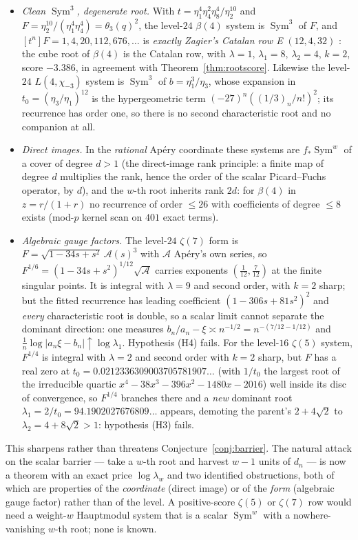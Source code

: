 \begin{itemize}
\item \emph{Clean $\operatorname{Sym}^3$, degenerate root.} With
$t=\eta_1^4\eta_4^2\eta_8^4/\eta_2^{10}$ and $F=\eta_2^{10}/(\eta_1^4\eta_4^4)=\theta_3(q)^2$,
the level-$24$ $\beta(4)$ system is $\operatorname{Sym}^3$ of $F$, and
$[t^n]F=1,4,20,112,676,\dots$ is \emph{exactly Zagier's Catalan row E} $(12,4,32)$
: the cube root of $\beta(4)$ is the Catalan row, with
$\lambda=1$, $\lambda_1=8$, $\lambda_2=4$, $k=2$, score $-3.386$, in agreement with
Theorem~\ref{thm:rootscore}. Likewise the level-$24$ $L(4,\chi_{-3})$ system is
$\operatorname{Sym}^3$ of $b=\eta_1^3/\eta_3$, whose expansion in $t_0=(\eta_3/\eta_1)^{12}$ is
the hypergeometric term $(-27)^n((1/3)_n/n!)^2$; its recurrence has order one, so there is no
second characteristic root and no companion at all.
\item \emph{Direct images.} In the \emph{rational} Apéry coordinate these systems are
$f_*\operatorname{Sym}^w$ of a cover of degree $d>1$ (the direct-image rank principle: a finite map of degree $d$ multiplies the rank, hence the order of the scalar Picard--Fuchs operator, by $d$),
and the $w$-th root inherits rank $2d$: for $\beta(4)$ in $z=r/(1+r)$ no recurrence of order
$\le26$ with coefficients of degree $\le8$ exists (mod-$p$ kernel scan on $401$ exact terms).
\item \emph{Algebraic gauge factors.} The level-$24$ $\zeta(7)$ form is
$F=\sqrt{1-34s+s^2}\,\mathcal A(s)^3$ with $\mathcal A$ Apéry's own series, so
$F^{1/6}=(1-34s+s^2)^{1/12}\sqrt{\mathcal A}$ carries exponents $(\tfrac1{12},\tfrac7{12})$ at
the finite singular points. It is integral with $\lambda=9$ and second order, with $k=2$
sharp; but the fitted recurrence has leading coefficient $(1-306s+81s^2)^2$ and \emph{every}
characteristic root is double, so a scalar limit cannot separate the dominant direction:
one measures $b_n/a_n-\xi\asymp n^{-1/2}=n^{-(7/12-1/12)}$ and
$\tfrac1n\log|a_n\xi-b_n|\uparrow\log\lambda_1$. Hypothesis (H4) fails.
For the level-$16$ $\zeta(5)$ system, $F^{1/4}$ is integral with $\lambda=2$ and second
order with $k=2$ sharp, but $F$ has a real zero at
$t_0=0.0212336309003705781907\ldots$ (with $1/t_0$ the largest root of the irreducible
quartic $x^4-38x^3-396x^2-1480x-2016$) well inside its disc of convergence, so $F^{1/4}$
branches there and a \emph{new} dominant root $\lambda_1=2/t_0=94.1902027676809\ldots$
appears, demoting the parent's $2+4\sqrt2$ to $\lambda_2=4+8\sqrt2>1$: hypothesis (H3) fails.
\end{itemize}

\begin{remark}
This sharpens rather than threatens Conjecture~\ref{conj:barrier}. The natural attack on the
scalar barrier --- take a $w$-th root and harvest $w-1$ units of $d_n$ --- is now a theorem
with an exact price $\log\lambda_w$ and two identified obstructions, both of which are
properties of the \emph{coordinate} (direct image) or of the \emph{form} (algebraic gauge
factor) rather than of the level. A positive-score $\zeta(5)$ or $\zeta(7)$ row would need a
weight-$w$ Hauptmodul system that is a scalar $\operatorname{Sym}^w$ with a nowhere-vanishing
$w$-th root; none is known.
\end{remark}
